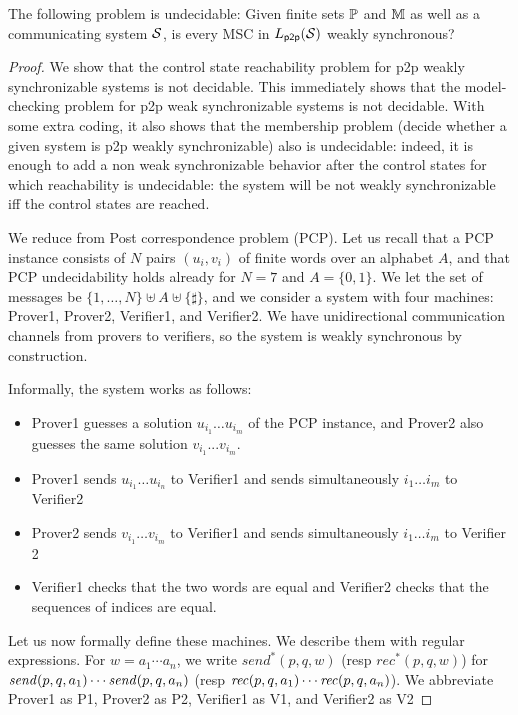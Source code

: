 \documentclass{article}
\begin{document}
\begin{theorem}\label{thm:p2p-weak-sync}
The following problem is undecidable:
Given finite sets $\mathbb{P}$ and $\mathbb{M}$ as well as a communicating system $\mathcal{S}$,
is every MSC in $L_{\mathsf{p2p}}(\mathcal{S})$ weakly synchronous?
\end{theorem}
\newcommand{\pcpSigma}{A}
\begin{proof}
	We show that the control state reachability problem for p2p weakly
	synchronizable systems is not decidable. This immediately shows
	that the model-checking problem for p2p weak synchronizable systems
	is not decidable.  With some extra coding, it also shows that the
	membership problem (decide whether a given system is p2p weakly synchronizable)
	also is undecidable: indeed, it is enough to add a non weak
	synchronizable behavior after the control states for which reachability is
	undecidable: the system will be not weakly synchronizable iff the control
	states are reached.
	
	We reduce from Post correspondence problem (PCP).
	Let us recall that a PCP instance consists of $N$ pairs $(u_i,v_i)$ of
	finite words over an alphabet $\pcpSigma$, and that PCP undecidability holds already for
	$N=7$ and $\pcpSigma=\{0,1\}$. We let the set of messages be
	$\{1,\dots,N\}\uplus\pcpSigma\uplus\{\sharp\}$, and we consider a system with
	four machines: Prover1, Prover2, Verifier1, and Verifier2. We have
	unidirectional communication channels from provers to verifiers,
	so the system is weakly synchronous by construction.
	
	Informally, the system works as follows:
	\begin{itemize}
	\item Prover1 guesses a solution $u_{i_1}\dots u_{i_m}$ of the PCP instance,
	and Prover2 also guesses the same solution $v_{i_1}...v_{i_m}$.
	\item Prover1 sends $u_{i_1}\dots u_{i_n}$ to Verifier1 and sends
	simultaneously $i_1\dots i_m$ to Verifier2
	\item Prover2 sends $v_{i_1}\dots v_{i_m}$ to Verifier1 and sends
	simultaneously $i_1\dots i_m$ to Verifier 2
	\item Verifier1 checks that the two words are equal and Verifier2 checks that the sequences of indices are equal.
	\end{itemize}
	
	Let us now formally define these machines.
	We describe them with regular expressions. For $w=a_1\cdots a_n$,
	we write $\mathit{send}^*(p,q,w)$ (resp $\mathit{rec}^*(p,q,w)$)
	for $\mathit{send}(p, q, a_1)\cdots \mathit{send}(p, q, a_n)$ (resp $\mathit{rec}(p, q, a_1)\cdots\mathit{rec}(p, q, a_n)$). We abbreviate Prover1 as P1, Prover2 as P2, Verifier1 as V1, and Verifier2 as V2
	

\end{proof}
\end{document}
